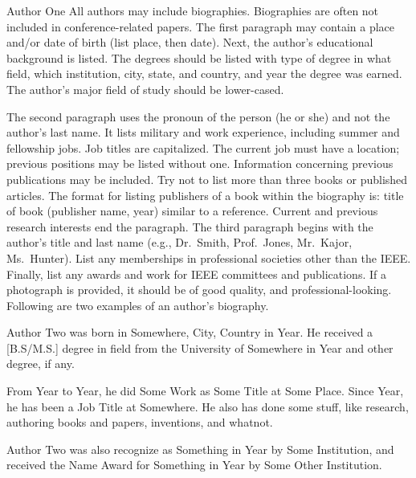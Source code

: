 \documentclass[]{latex/ieeeaccess}
\begin{document}
\begin{IEEEbiography}{Author One} All authors may include 
biographies. Biographies are often not included in conference-related
papers. The first paragraph may contain a place and/or date of birth (list place, then date). Next,
the author's educational background is listed. The degrees should be
listed with type of degree in what field, which institution, city,
state, and country, and year the degree was earned. The author's major
field of study should be lower-cased. 

The second paragraph uses the pronoun of the person (he or she) and not the 
author's last name. It lists military and work experience, including summer 
and fellowship jobs. Job titles are capitalized. The current job must have a 
location; previous positions may be listed 
without one. Information concerning previous publications may be included. 
Try not to list more than three books or published articles. The format for 
listing publishers of a book within the biography is: title of book 
(publisher name, year) similar to a reference. Current and previous research 
interests end the paragraph. The third paragraph begins with the author's 
title and last name (e.g., Dr.\ Smith, Prof.\ Jones, Mr.\ Kajor, Ms.\ Hunter). 
List any memberships in professional societies other than the IEEE. Finally, 
list any awards and work for IEEE committees and publications. If a 
photograph is provided, it should be of good quality, and 
professional-looking. Following are two examples of an author's biography.
\end{IEEEbiography}

\begin{IEEEbiography}{Author Two} was born in Somewhere, City, Country in 
Year. He received a [B.S/M.S.] degree in field from 
the University of Somewhere in Year and other degree, if any.

From Year to Year, he did Some Work as Some Title at Some Place. Since Year, he has been a Job Title at Somewhere. 
He also has done some stuff, like research, authoring books and papers, inventions, and whatnot. 

Author Two was also recognize as Something in Year by Some Institution, and received the Name Award for Something in Year by Some Other Institution.
\end{IEEEbiography}

\EOD
\end{document}
